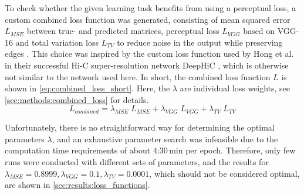 To check whether the given learning task benefits from using a perceptual loss, a custom combined loss function was generated,
consisting of mean squared error $L_\mathit{MSE}$ between true- and predicted matrices, perceptual loss $L_\mathit{VGG}$ based on VGG-16 and 
total variation loss $L_\mathit{TV}$ to reduce noise in the output while preserving edges \cite{Rudin1992}. 
This choice was inspired by the custom loss function used by Hong et al. in their successful Hi-C super-resolution network DeepHiC \cite{Hong2020},
which is otherwise not similar to the network used here.
In short, the combined loss function $L$ is shown in \cref{eq:combined_loss_short}. Here, the $\lambda$ are individual loss weights, see \cref{sec:methods:combined_loss} for details.
\begin{equation}
 L_\mathit{combined} = \lambda_\mathit{MSE} \; L_\mathit{MSE} + \lambda_\mathit{VGG} \; L_\mathit{VGG} + \lambda_\mathit{TV} \; L_\mathit{TV} \label{eq:combined_loss_short}
\end{equation}

Unfortunately, there is no straightforward way for determining the optimal parameters $\lambda$,
and an exhaustive parameter search was infeasible due to the computation time requirements of about 4:30\,min per epoch.
Therefore, only few runs were conducted with different sets of parameters,
and the results for $\lambda_\mathit{MSE} = 0.8999, \lambda_\mathit{VGG}=0.1, \lambda_\mathit{TV}=0.0001$,
which should not be considered optimal, are shown in \cref{sec:results:loss_functions}.

